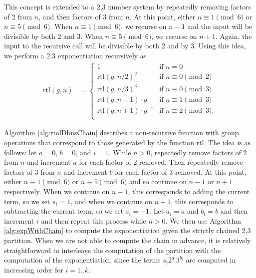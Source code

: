 \documentclass{ucalgthes1}
\theoremstyle{definition}
\begin{document}
This concept is extended to a 2,3 number system by repeatedly removing factors of 2 from $n$, and then factors of 3 from $n$.  At this point, either $n \equiv 1 \pmod 6$ or $n \equiv 5 \pmod 6$.  When $n \equiv 1 \pmod 6$, we recurse on $n-1$ and the input will be divisible by both 2 and 3.  When $n \equiv 5 \pmod 6$, we recurse on $n+1$.  Again, the input to the recursive call will be divisible by both 2 and by 3.  Using this idea, we perform a 2,3 exponentiation recursively as
\newcommand{\rtol}{\textrm{rtl}}
\begin{align*}
\rtol(g, n) &= \begin{cases}
               1 & \textrm{if $n = 0$} \\
               {\rtol(g, n/2)}^2 & \textrm{if $n \equiv 0 \pmod 2$} \\
               {\rtol(g, n/3)}^3 & \textrm{if $n \equiv 0 \pmod 3$} \\
               \rtol(g, n-1) \cdot g & \textrm{if $n \equiv 1 \pmod 3$} \\
               \rtol(g, n+1) \cdot g^{-1} & \textrm{if $n \equiv 2 \pmod 3$}. \\
	       \end{cases}
\end{align*}

Algorithm \ref{alg:rtolDbnsChain} describes a non-recursive function with group operations that correspond to those generated by the function $\rtol$.  The idea is as follows: let $a = 0$, $b=0$, and $i=1$.  While $n > 0$, repeatedly remove factors of 2 from $n$ and increment $a$ for each factor of 2 removed. Then repeatedly remove factors of 3 from $n$ and increment $b$ for each factor of 3 removed. At this point, either $n \equiv 1 \pmod 6$ or $n \equiv 5 \pmod 6$ and so continue on $n-1$ or $n+1$ respectively.  When we continue on $n-1$, this corresponds to adding the current term, so we set $s_i=1$, and when we continue on $n+1$, this corresponds to subtracting the current term, so we set $s_i=-1$. Let $a_i = a$ and $b_i = b$ and then increment $i$ and then repeat this process while $n > 0$.  We then use Algorithm \ref{alg:expWithChain} to compute the exponentiation given the strictly chained 2,3 partition.  When we are not able to compute the chain in advance, it is relatively straightforward to interleave the computation of the partition with the computation of the exponentiation, since the terms $s_i2^{a_i}3^{b_i}$ are computed in increasing order for $i=1..k$.
\end{document}

